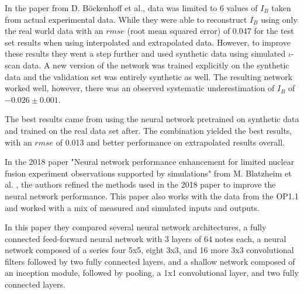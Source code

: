 In the paper from D. Böckenhoff et al., data was limited to 6 values of $I_B$ taken from actual experimental data. While they were able to reconstruct $I_B$ using only the real world data with an $rmse$ (root mean squared error) of 0.047 for the test set results when using interpolated and extrapolated data. However, to improve these results they went a step further and used synthetic data using simulated $\iota$-scan data. A new version of the network was trained explicitly on the synthetic data and the validation set was entirely synthetic as well. The resulting network worked well, however, there was an observed systematic underestimation of $I_B$ of $-0.026 \pm 0.001$.

The best results came from using the neural network pretrained on synthetic data and trained on the real data set after. The combination yielded the best results, with an $rmse$ of 0.013 and better performance on extrapolated results overall.

In the 2018 paper "Neural network performance enhancement for limited nuclear fusion experiment observations supported by simulations" from M. Blatzheim et al. \cite{Blatzheim_2019}, the authors refined the methods used in the 2018 paper to improve the neural network performance. This paper also works with the data from the OP1.1 and worked with a mix of measured and simulated inputs and outputs.

In this paper they compared several neural network architectures, a fully connected feed-forward neural network with 3 layers of 64 notes each, a neural network composed of a series four 5x5, eight 3x3, and 16 more 3x3 convolutional filters followed by two fully connected layers, and a shallow network composed of an inception module, followed by pooling, a 1x1 convolutional layer, and two fully connected layers.
